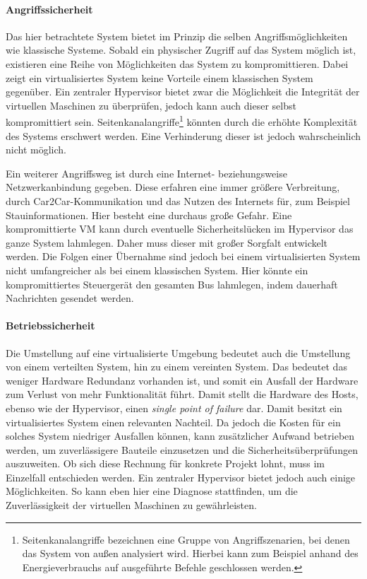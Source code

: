 \documentclass[
  a4paper,					    %
  twoside,
  DIV=calc,     				%
  bibliography=totoc,
  cleardoublepage=empty,
  ngerman,     					%
  final       					%
]{scrbook}
\begin{document}
\paragraph{Angriffssicherheit}
Das hier betrachtete System bietet im Prinzip die selben Angriffsmöglichkeiten wie klassische Systeme. Sobald ein physischer Zugriff auf das System möglich ist, existieren eine Reihe von Möglichkeiten das System zu kompromittieren. Dabei zeigt ein virtualisiertes System keine Vorteile einem klassischen System gegenüber. Ein zentraler Hypervisor bietet zwar die Möglichkeit die Integrität der virtuellen Maschinen zu überprüfen, jedoch kann auch dieser selbst kompromittiert sein. Seitenkanalangriffe\footnote{Seitenkanalangriffe bezeichnen eine Gruppe von Angriffszenarien, bei denen das System von außen analysiert wird. Hierbei kann zum Beispiel anhand des Energieverbrauchs auf ausgeführte Befehle geschlossen werden.} könnten durch die erhöhte Komplexität des Systems erschwert werden. Eine Verhinderung dieser ist jedoch wahrscheinlich nicht möglich.

Ein weiterer Angriffsweg ist durch eine Internet- beziehungsweise Netzwerkanbindung gegeben. Diese erfahren eine immer größere Verbreitung, durch Car2Car-Kommunikation und das Nutzen des Internets für, zum Beispiel Stauinformationen. Hier besteht eine durchaus große Gefahr. Eine kompromittierte VM kann durch eventuelle Sicherheitslücken im Hypervisor das ganze System lahmlegen. Daher muss dieser mit großer Sorgfalt entwickelt werden. Die Folgen einer Übernahme sind jedoch bei einem virtualisierten System nicht umfangreicher als bei einem klassischen System. Hier könnte ein kompromittiertes Steuergerät den gesamten Bus lahmlegen, indem dauerhaft Nachrichten gesendet werden.

\paragraph{Betriebssicherheit}
Die Umstellung auf eine virtualisierte Umgebung bedeutet auch die Umstellung von einem verteilten System, hin zu einem vereinten System. Das bedeutet das weniger Hardware Redundanz vorhanden ist, und somit ein Ausfall der Hardware zum Verlust von mehr Funktionalität führt. Damit stellt die Hardware des Hosts, ebenso wie der Hypervisor, einen \emph{single point of failure} dar. Damit besitzt ein virtualisiertes System einen relevanten Nachteil. Da jedoch die Kosten für ein solches System niedriger Ausfallen können, kann zusätzlicher Aufwand betrieben werden, um zuverlässigere Bauteile einzusetzen und die Sicherheitsüberprüfungen auszuweiten. Ob sich diese Rechnung für konkrete Projekt lohnt, muss im Einzelfall entschieden werden. Ein zentraler Hypervisor bietet jedoch auch einige Möglichkeiten. So kann eben hier eine Diagnose stattfinden, um die Zuverlässigkeit der virtuellen Maschinen zu gewährleisten. 
\end{document}
